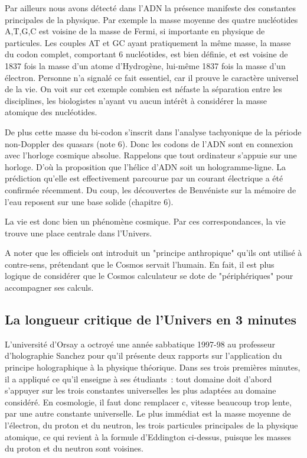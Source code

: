 \documentclass[a4paper,12pt]{article}
\begin{document}
    Par ailleurs nous avons détecté dans l'ADN la présence manifeste des constantes principales de la physique. Par exemple la masse moyenne des quatre nucléotides A,T,G,C est voisine de la masse de Fermi, si importante en physique de particules. Les couples AT et GC ayant pratiquement la même masse, la masse du codon complet, comportant 6 nucléotides, est bien définie, et est voisine de 1837 fois la masse d'un atome d'Hydrogène, lui-même 1837 fois la masse d'un électron. Personne n’a signalé ce fait essentiel, car il prouve le caractère universel de la vie. On voit sur cet exemple combien est néfaste la séparation entre les disciplines, les biologistes n’ayant vu aucun intérêt à considérer la masse atomique des nucléotides.

    De plus cette masse du bi-codon s'inscrit dans l'analyse tachyonique de la période non-Doppler des quasars (note 6). Donc les codons de l'ADN sont en connexion avec l'horloge cosmique absolue. Rappelons que tout ordinateur s'appuie sur une horloge. D'où la proposition que l'hélice d'ADN soit un hologramme-ligne. La prédiction qu'elle est effectivement parcourue par un courant électrique a été confirmée récemment. Du coup, les découvertes de Benvéniste sur la mémoire de l'eau reposent sur une base solide  (chapitre 6).

La vie est donc bien un phénomène cosmique. Par ces correspondances, la vie trouve une place centrale dans l'Univers. 

A noter que les officiels ont introduit un "principe anthropique" qu'ils ont utilisé à contre-sens, prétendant que le Cosmos servait l’humain. En fait, il est plus logique de considérer que le Cosmos calculateur se dote de  "périphériques" pour accompagner ses calculs. 


\subsection{La longueur critique de l'Univers en 3 minutes}

     L'université d'Orsay a octroyé une année sabbatique 1997-98 au professeur d'holographie Sanchez pour qu'il présente deux rapports sur l'application du principe holographique à la physique théorique. Dans ses trois premières minutes, il a appliqué ce qu'il enseigne à ses étudiants : tout domaine doit d'abord s'appuyer sur les trois constantes universelles les plus adaptées au domaine considéré. En cosmologie, il faut donc remplacer c, vitesse beaucoup trop lente, par une autre constante universelle. Le plus immédiat est la masse moyenne de l'électron, du proton et du neutron, les trois particules principales de la physique atomique, ce qui revient à la formule d'Eddington ci-dessus, puisque les masses du proton et du neutron sont voisines. 
\end{document}
